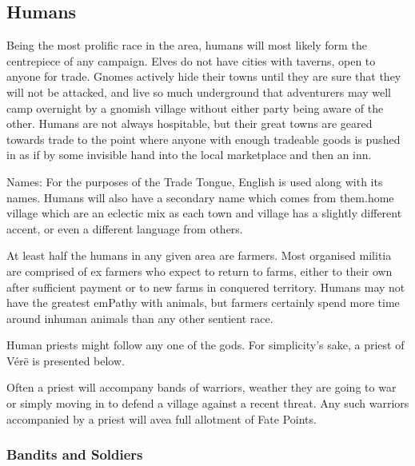 \begin{multicols}{2}
\subsection{Humans}

Being the most prolific race in the area, humans will most likely form the centrepiece of any campaign.  Elves do not have cities with taverns, open to anyone for trade.  Gnomes actively hide their towns until they are sure that they will not be attacked, and live so much underground that adventurers may well camp overnight by a gnomish village without either party being aware of the other.  Humans are not always hospitable, but their great towns are geared towards trade to the point where anyone with enough tradeable goods is pushed in as if by some invisible hand into the local marketplace and then an inn.

	Names: For the purposes of the Trade Tongue, English is used along with its names.  Humans will also have a secondary name which comes from them.home village which are an eclectic mix as each town and village has a slightly different accent, or even a different language from others.

\label{human_trader}

At least half the humans in any given area are farmers.  Most organised militia are comprised of ex farmers who expect to return to farms, either to their own after sufficient payment or to new farms in conquered territory.  Humans may not have the greatest emPathy with animals, but farmers certainly spend more time around inhuman animals than any other sentient race.

\humantrader

\label{human_priest}

Human priests might follow any one of the gods.
For simplicity's sake, a priest of V\'{e}r\"{e} is presented below.

\humanpriest

Often a priest will accompany bands of warriors, weather they are going to war or simply moving in to defend a village against a recent threat.  Any such warriors accompanied by a priest will avea full allotment of Fate Points.

\subsubsection{Bandits and Soldiers}\label{human_soldier}


\end{multicols}
